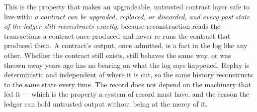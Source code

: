 This is the property that makes an upgradeable, untrusted contract layer safe to
live with: \emph{a contract can be upgraded, replaced, or discarded, and every
past state of the ledger still reconstructs exactly}, because reconstruction reads
the transactions a contract once produced and never re-runs the contract that
produced them. A contract's output, once admitted, is a fact in the log like any
other. Whether the contract still exists, still behaves the same way, or was
thrown away years ago has no bearing on what the log says happened. Replay is
deterministic and independent of where it is cut, so the same history
reconstructs to the same state every time. The record does not depend on the
machinery that fed it --- which is the property a system of record must have, and
the reason the ledger can hold untrusted output without being at the mercy of it.
